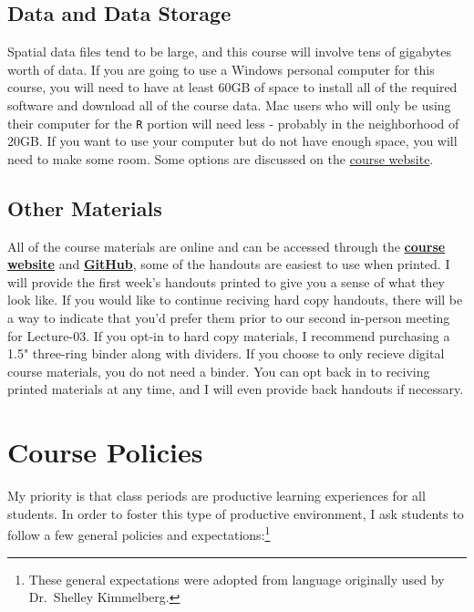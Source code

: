 \documentclass[]{book}
\let\rmarkdownfootnote\footnote%
\def\footnote{\protect\rmarkdownfootnote}
\begin{document}
\hypertarget{data-and-data-storage}{%
\section{Data and Data Storage}\label{data-and-data-storage}}

Spatial data files tend to be large, and this course will involve tens of gigabytes worth of data. If you are going to use a Windows personal computer for this course, you will need to have at least 60GB of space to install all of the required software and download all of the course data. Mac users who will only be using their computer for the \texttt{R} portion will need less - probably in the neighborhood of 20GB. If you want to use your computer but do not have enough space, you will need to make some room. Some options are discussed on the \href{https://slu-soc5650.github.io/docs/course-software/}{course website}.

\hypertarget{other-materials}{%
\section{Other Materials}\label{other-materials}}

All of the course materials are online and can be accessed through the \href{https://slu-soc5650.github.io}{\textbf{course website}} and \href{http://www.github.com}{\textbf{GitHub}}, some of the handouts are easiest to
use when printed. I will provide the first week's handouts printed to give you a sense of what they look like. If you would like to continue reciving hard copy handouts, there will be a way to indicate that you'd prefer them prior to our second in-person meeting for Lecture-03. If you opt-in to hard copy materials, I recommend purchasing a 1.5"
three-ring binder along with dividers. If you choose to only recieve digital course materials, you do not need a binder. You can opt back in to reciving printed materials at any time, and I will even provide back handouts if necessary.

\hypertarget{course-policies}{%
\chapter{Course Policies}\label{course-policies}}

My priority is that class periods are productive learning experiences for all students. In order to foster this type of productive environment, I ask students to follow a few general policies and expectations:\footnote{These general expectations were adopted from language originally used by Dr.~Shelley Kimmelberg.}
\end{document}
